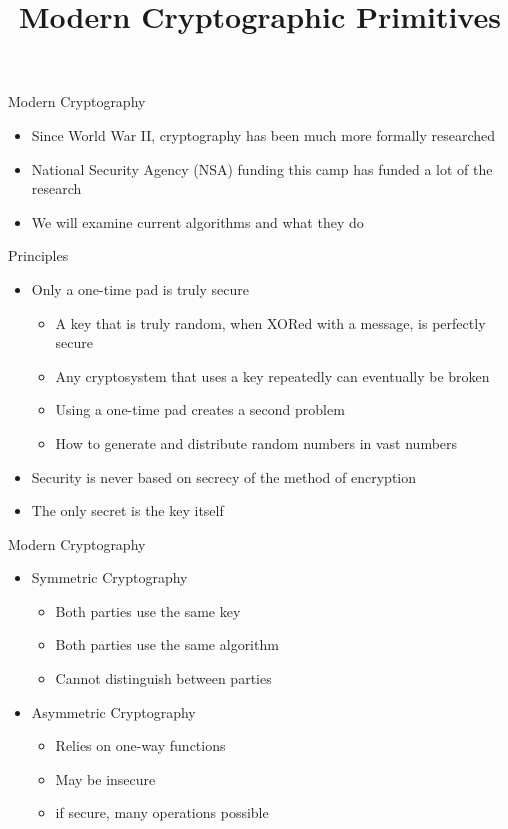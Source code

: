 

\title[]{Modern Cryptographic Primitives}

\begin{frame}
\titlepage
\end{frame}


\begin{frame}{Modern Cryptography}
\begin{itemize}
    \item Since World War II, cryptography has been much more formally researched
    \item National Security Agency (NSA) funding this camp has funded a lot of the research
    \item We will examine current algorithms and what they do
\end{itemize}
\end{frame}

\begin{frame}{Principles}
\begin{itemize}
    \item Only a one-time pad is truly secure
    \begin{itemize}
        \item A key that is truly random, when XORed with a message, is perfectly secure
        \item Any cryptosystem that uses a key repeatedly can eventually be broken
        \item Using a one-time pad creates a second problem
        \item How to generate and distribute random numbers in vast numbers
    \end{itemize}
    \item Security is never based on secrecy of the method of encryption
    \item The only secret is the key itself
\end{itemize}
\end{frame}
    

\begin{frame}{Modern Cryptography}
\begin{itemize}
    \item Symmetric Cryptography
    \begin{itemize}
    \item Both parties use the same key
    \item Both parties use the same algorithm
    \item Cannot distinguish between parties
    \end{itemize}
    \item Asymmetric Cryptography
    \begin{itemize}
    \item Relies on one-way functions
    \item May be insecure
    \item if secure, many operations possible
    \end{itemize}
\end{itemize}
\end{frame}

